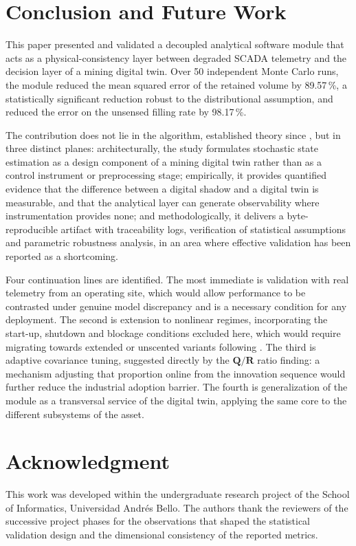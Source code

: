 \documentclass[conference]{IEEEtran}
\begin{document}
\section{Conclusion and Future Work}
\label{sec:conclusion}

This paper presented and validated a decoupled analytical software module that
acts as a physical-consistency layer between degraded SCADA telemetry and the
decision layer of a mining digital twin. Over 50 independent Monte Carlo runs,
the module reduced the mean squared error of the retained volume by 89.57\,\%,
a statistically significant reduction robust to the distributional assumption,
and reduced the error on the unsensed filling rate by 98.17\,\%.

The contribution does not lie in the algorithm, established theory since
\cite{kalman1960}, but in three distinct planes: architecturally, the study
formulates stochastic state estimation as a design component of a mining digital
twin rather than as a control instrument or preprocessing stage; empirically, it
provides quantified evidence that the difference between a digital shadow and a
digital twin is measurable, and that the analytical layer can generate
observability where instrumentation provides none; and methodologically, it
delivers a byte-reproducible artifact with traceability logs, verification of
statistical assumptions and parametric robustness analysis, in an area where
effective validation has been reported as a shortcoming.

Four continuation lines are identified. The most immediate is validation with
real telemetry from an operating site, which would allow performance to be
contrasted under genuine model discrepancy and is a necessary condition for any
deployment. The second is extension to nonlinear regimes, incorporating the
start-up, shutdown and blockage conditions excluded here, which would require
migrating towards extended or unscented variants following
\cite{barzaga2025}. The third is adaptive covariance tuning, suggested directly
by the $\mathbf{Q}/\mathbf{R}$ ratio finding: a mechanism adjusting that
proportion online from the innovation sequence would further reduce the
industrial adoption barrier. The fourth is generalization of the module as a
transversal service of the digital twin, applying the same core to the different
subsystems of the asset.

\section*{Acknowledgment}

This work was developed within the undergraduate research project of the School
of Informatics, Universidad Andr\'es Bello. The authors thank the reviewers of
the successive project phases for the observations that shaped the statistical
validation design and the dimensional consistency of the reported metrics.



\end{document}
